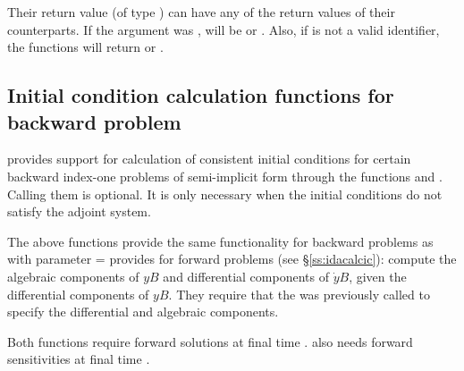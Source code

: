 Their return value  (of type ) can have any of the return values of their counterparts.
If the  argument was , 
 will be  or . 
Also, if  is not a valid identifier, the functions will return 
 or .


\subsection{Initial condition calculation functions for backward problem}
\label{sss:idacalcicB}

{\idas} provides support for calculation of consistent initial 
conditions for certain backward index-one problems of semi-implicit form through
the functions  and . Calling them is 
optional. It is only necessary when the initial conditions do not satisfy
the adjoint system. 

The above functions provide the same functionality for backward problems as 
 with parameter  =   
provides for forward problems (see \S\ref{ss:idacalcic}): compute the 
algebraic components of $yB$ and differential  components of $\dot{y}B$, given 
the differential components of $yB$.  They require that the 
was previously called to specify the differential and algebraic components.               


Both functions require forward solutions at final time .  
also needs forward sensitivities at final time .

